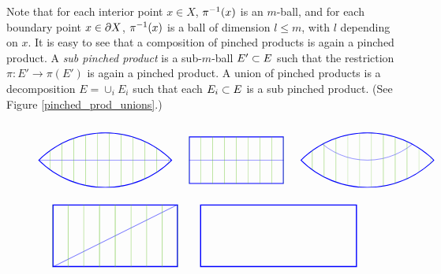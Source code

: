 Note that for each interior point $x\in X$, $\pi\inv(x)$ is an $m$-ball,
and for each boundary point $x\in\bd X$, $\pi\inv(x)$ is a ball of dimension
$l \le m$, with $l$ depending on $x$.
It is easy to see that a composition of pinched products is again a pinched product.
A {\it sub pinched product} is a sub-$m$-ball $E'\sub E$ such that the restriction
$\pi:E'\to \pi(E')$ is again a pinched product.
A {union} of pinched products is a decomposition $E = \cup_i E_i$
such that each $E_i\sub E$ is a sub pinched product.
(See Figure \ref{pinched_prod_unions}.)
\begin{figure}[t]
$$
\begin{tikzpicture}[baseline=0]
\begin{scope}
\path[clip] (0,0) arc (135:45:4) arc (-45:-135:4);
\draw[blue,line width=2pt] (0,0) arc (135:45:4) arc (-45:-135:4);
\draw[blue] (0,0) -- (5.66,0);
\foreach \x in {0, 0.5, ..., 6} {
	\draw[green!50!brown] (\x,-2) -- (\x,2);
}
\end{scope}
\end{tikzpicture}
\qquad
\begin{tikzpicture}[baseline=0]
\begin{scope}
\path[clip] (0,-1) rectangle (4,1);
\draw[blue,line width=2pt] (0,-1) rectangle (4,1);
\draw[blue] (0,0) -- (5,0);
\foreach \x in {0, 0.5, ..., 6} {
	\draw[green!50!brown] (\x,-2) -- (\x,2);
}
\end{scope}
\end{tikzpicture}
\qquad
\begin{tikzpicture}[baseline=0]
\begin{scope}
\path[clip] (0,0) arc (135:45:4) arc (-45:-135:4);
\draw[blue,line width=2pt] (0,0) arc (135:45:4) arc (-45:-135:4);
\draw[blue] (2.83,3) circle (3);
\foreach \x in {0, 0.5, ..., 6} {
	\draw[green!50!brown] (\x,-2) -- (\x,2);
}
\end{scope}
\end{tikzpicture}
$$
$$
\begin{tikzpicture}[baseline=0]
\begin{scope}
\path[clip] (0,-1) rectangle (4,1);
\draw[blue,line width=2pt] (0,-1) rectangle (4,1);
\draw[blue] (0,-1) -- (4,1);
\foreach \x in {0, 0.5, ..., 6} {
	\draw[green!50!brown] (\x,-2) -- (\x,2);
}
\end{scope}
\end{tikzpicture}
\qquad
\begin{tikzpicture}[baseline=0]
\begin{scope}
\path[clip] (0,-1) rectangle (5,1);
\draw[blue,line width=2pt] (0,-1) rectangle (5,1);

\end{scope}
\end{tikzpicture}$$
\end{figure}
